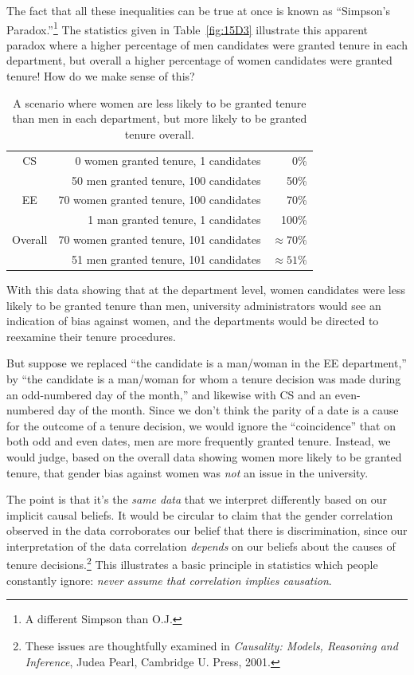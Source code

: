 \begin{editingnotes}
The fact that all these inequalities can be true at once is known as
``Simpson's Paradox.''\footnote{A different Simpson than O.J.}  The
statistics given in Table~\ref{fig:15D3} illustrate this apparent
paradox where a higher percentage of men candidates were
granted tenure in each department, but overall a higher percentage of
women candidates were granted tenure!  How do we make sense of this?

\begin{table}

\begin{tabular}{crr}
CS & 0 women granted tenure, 1 candidates      &   0\% \\
   & 50 men granted tenure, 100 candidates     &  50\% \\
EE & 70 women granted tenure, 100 candidates   &  70\% \\
   & 1 man granted tenure, 1 candidates         & 100\% \\
\hline
Overall & 70 women granted tenure, 101 candidates & $\approx 70\%$ \\
        & 51 men granted tenure, 101 candidates   & $\approx 51\%$
\end{tabular}

\caption{A scenario where women are less likely to be granted tenure
  than men in each department, but more likely to be granted tenure
  overall.}

\label{fig:15D3-tenure}

\end{table}

With this data showing that at the department level, women
candidates were less likely to be granted tenure than men, university
administrators would see an indication of bias against women,
and the departments would be directed to reexamine their tenure
procedures.

But suppose we replaced ``the candidate is a man/woman in the EE
department,'' by ``the candidate is a man/woman for whom a tenure
decision was made during an odd-numbered day of the month,'' and
likewise with CS and an even-numbered day of the month.  Since we
don't think the parity of a date is a cause for the outcome of a
tenure decision, we would ignore the ``coincidence'' that on both odd
and even dates, men are more frequently granted tenure.  Instead, we
would judge, based on the overall data showing women more likely to be
granted tenure, that gender bias against women was \emph{not} an issue
in the university.

The point is that it's the \emph{same data} that we interpret
differently based on our implicit causal beliefs.  It would be
circular to claim that the gender correlation observed in the data
corroborates our belief that there is discrimination, since our
interpretation of the data correlation \emph{depends} on our beliefs
about the causes of tenure decisions.\footnote{These issues are
  thoughtfully examined in \emph{Causality: Models, Reasoning and
    Inference}, Judea Pearl, Cambridge U. Press, 2001.}  This
illustrates a basic principle in statistics which people constantly
ignore: \emph{never assume that correlation implies causation}.

\end{editingnotes}
